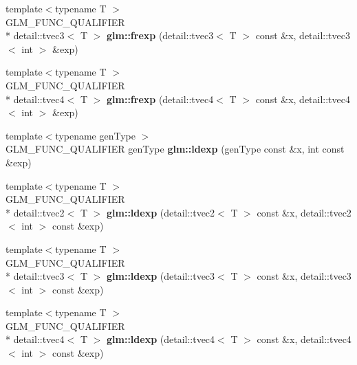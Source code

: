 \begin{DoxyCompactItemize}
\item 
\hypertarget{namespaceglm_a228690eed3874fcddef0b74864018a97}{{\footnotesize template$<$typename T $>$ }\\G\-L\-M\-\_\-\-F\-U\-N\-C\-\_\-\-Q\-U\-A\-L\-I\-F\-I\-E\-R \\*
detail\-::tvec3$<$ T $>$ {\bfseries glm\-::frexp} (detail\-::tvec3$<$ T $>$ const \&x, detail\-::tvec3$<$ int $>$ \&exp)}\label{namespaceglm_a228690eed3874fcddef0b74864018a97}

\item 
\hypertarget{namespaceglm_a3d5c41a07e38340ad4a30b46c707120c}{{\footnotesize template$<$typename T $>$ }\\G\-L\-M\-\_\-\-F\-U\-N\-C\-\_\-\-Q\-U\-A\-L\-I\-F\-I\-E\-R \\*
detail\-::tvec4$<$ T $>$ {\bfseries glm\-::frexp} (detail\-::tvec4$<$ T $>$ const \&x, detail\-::tvec4$<$ int $>$ \&exp)}\label{namespaceglm_a3d5c41a07e38340ad4a30b46c707120c}

\item 
\hypertarget{namespaceglm_a2632eefd82cbdf3ca860c41579a5ef9e}{{\footnotesize template$<$typename gen\-Type $>$ }\\G\-L\-M\-\_\-\-F\-U\-N\-C\-\_\-\-Q\-U\-A\-L\-I\-F\-I\-E\-R gen\-Type {\bfseries glm\-::ldexp} (gen\-Type const \&x, int const \&exp)}\label{namespaceglm_a2632eefd82cbdf3ca860c41579a5ef9e}

\item 
\hypertarget{namespaceglm_af3705e92f7dbca7dee3a2412d4033833}{{\footnotesize template$<$typename T $>$ }\\G\-L\-M\-\_\-\-F\-U\-N\-C\-\_\-\-Q\-U\-A\-L\-I\-F\-I\-E\-R \\*
detail\-::tvec2$<$ T $>$ {\bfseries glm\-::ldexp} (detail\-::tvec2$<$ T $>$ const \&x, detail\-::tvec2$<$ int $>$ const \&exp)}\label{namespaceglm_af3705e92f7dbca7dee3a2412d4033833}

\item 
\hypertarget{namespaceglm_a5de427047c366728ca1257c06fa38e2d}{{\footnotesize template$<$typename T $>$ }\\G\-L\-M\-\_\-\-F\-U\-N\-C\-\_\-\-Q\-U\-A\-L\-I\-F\-I\-E\-R \\*
detail\-::tvec3$<$ T $>$ {\bfseries glm\-::ldexp} (detail\-::tvec3$<$ T $>$ const \&x, detail\-::tvec3$<$ int $>$ const \&exp)}\label{namespaceglm_a5de427047c366728ca1257c06fa38e2d}

\item 
\hypertarget{namespaceglm_aed70eedaf2ffabe7cb6a36d16f83181d}{{\footnotesize template$<$typename T $>$ }\\G\-L\-M\-\_\-\-F\-U\-N\-C\-\_\-\-Q\-U\-A\-L\-I\-F\-I\-E\-R \\*
detail\-::tvec4$<$ T $>$ {\bfseries glm\-::ldexp} (detail\-::tvec4$<$ T $>$ const \&x, detail\-::tvec4$<$ int $>$ const \&exp)}\label{namespaceglm_aed70eedaf2ffabe7cb6a36d16f83181d}

\end{DoxyCompactItemize}


